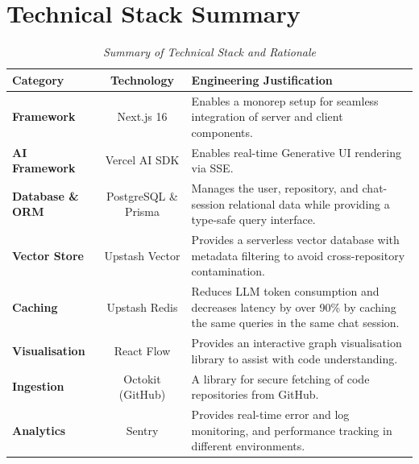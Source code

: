 \section{Technical Stack Summary}
\begin{table}[H]
    \centering
    \begin{tabular}{@{}lc>{\raggedright\arraybackslash}p{8cm}@{}}
        \toprule
        \textbf{Category} & \textbf{Technology} & \textbf{Engineering Justification} \\
        \midrule
        \textbf{Framework} & Next.js 16 & Enables a monorep setup for seamless integration of server and client components. \\
        \addlinespace
        \textbf{AI Framework} & Vercel AI SDK & Enables real-time Generative UI rendering via SSE. \\
        \addlinespace
        \textbf{Database \& ORM} & PostgreSQL \& Prisma & Manages the user, repository, and chat-session relational data while providing a type-safe query interface. \\
        \addlinespace
        \textbf{Vector Store} & Upstash Vector & Provides a serverless vector database with metadata filtering to avoid cross-repository contamination. \\
        \addlinespace
        \textbf{Caching} & Upstash Redis & Reduces LLM token consumption and decreases latency by over 90\% by caching the same queries in the same chat session. \\
        \addlinespace
        \textbf{Visualisation} & React Flow & Provides an interactive graph visualisation library to assist with code understanding. \\
        \addlinespace
        \textbf{Ingestion} & Octokit (GitHub) & A library for secure fetching of code repositories from GitHub. \\
        \addlinespace
        \textbf{Analytics} & Sentry & Provides real-time error and log monitoring, and performance tracking in different environments. \\
        \bottomrule
    \end{tabular}
    \caption{\textit{Summary of Technical Stack and Rationale}}
    \label{tab:tech_stack_rationale}
\end{table}